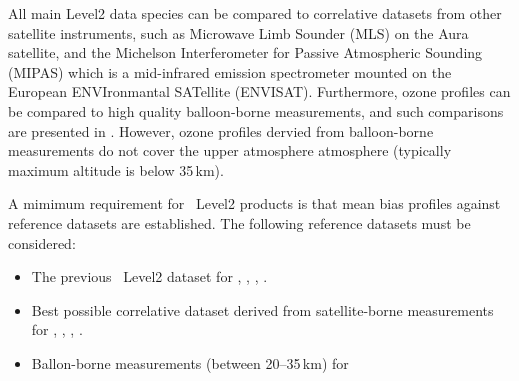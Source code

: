 All main Level2 data species can be compared to correlative datasets
from other satellite instruments, such as Microwave Limb Sounder (MLS)
on the Aura satellite, and the Michelson Interferometer for Passive
Atmospheric Sounding (MIPAS) which is a mid-infrared emission spectrometer
mounted on the European ENVIronmantal SATellite (ENVISAT).
Furthermore, \smr ozone profiles can be compared to high quality balloon-borne 
measurements, and such comparisons are presented in \citep{jegou:techn:08}.
However, ozone profiles dervied from balloon-borne 
measurements do not cover the upper atmosphere atmosphere (typically maximum
altitude is below 35\,km).

A mimimum requirement for \smr\ Level2 products is that mean bias 
profiles against reference datasets are established. 
The following reference datasets must be considered:
\begin{itemize}

\item The previous \smr\ Level2 dataset for , , , .

\item Best possible correlative dataset derived from satellite-borne measurements
      for , , , .

\item Ballon-borne measurements (between 20--35\,km) for 

\end{itemize}



 
